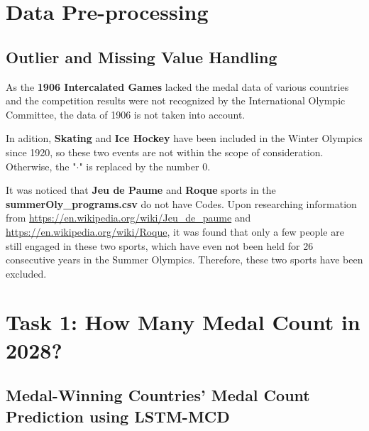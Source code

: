 \documentclass{mcmthesis}
\begin{document}
	\section{Data Pre-processing}
	
	\subsection{Outlier and Missing Value Handling}
	As the \textbf{1906 Intercalated Games} lacked the medal data of various countries and the competition results were not recognized by the International Olympic Committee, the data of 1906 is not taken into account.
	
	In adition, \textbf{Skating} and \textbf{Ice Hockey} have been included in the Winter Olympics since 1920, so these two events are not within the scope of consideration. Otherwise, the "$\cdot$" is replaced by the number $0$. 
	
	It was noticed that \textbf{Jeu de Paume} and \textbf{Roque} sports in the {\bf summerOly\_programs.csv} do not have Codes. Upon researching information from {\color{blue}\url{https://en.wikipedia.org/wiki/Jeu_de_paume}} and {\color{blue}\url{https://en.wikipedia.org/wiki/Roque}}, it was found that only a few people are still engaged in these two sports, which have even not been held for 26 consecutive years in the Summer Olympics. Therefore, these two sports have been excluded.
	
	
	
	
	
	
	
	
	
	
	
	
	
	
	
	
	\newpage
	\section{Task 1: How Many Medal Count in 2028? }
	\subsection{Medal-Winning Countries' Medal Count Prediction using LSTM-MCD}
	
\end{document}
